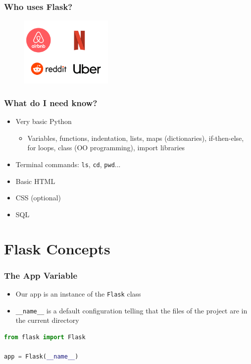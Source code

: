 \documentclass[fleqn,aspectratio=169,10pt]{beamer}
\begin{document}
\begin{frame}[fragile]
  \frametitle{Who uses Flask?}
          \pause
  \begin{figure}[]
    \centering
    \includegraphics[width=0.4\textwidth]{companies}
  \end{figure}
\end{frame}

\begin{frame}
  \frametitle{What do I need know?}
  \begin{itemize}
          \pause
    \item Very basic Python
          \begin{itemize}
            \item Variables, functions, indentation, lists, maps (dictionaries), if-then-else, for loops, class (OO programming), import libraries
          \end{itemize}
    \item Terminal commands: \texttt{ls}, \texttt{cd}, \texttt{pwd}...
    \item Basic HTML
    \item CSS (optional)
    \item SQL
  \end{itemize}
\end{frame}

\section{Flask Concepts}

\begin{frame}[fragile]
  \frametitle{The App Variable}
  \begin{itemize}
    \item Our app is an instance of the \texttt{Flask} class
    \item \texttt{\_\_name\_\_} is a default configuration telling that the files of the project are in the current directory
  \end{itemize}
\begin{lstlisting}[language=Python]
from flask import Flask

app = Flask(__name__)
\end{lstlisting}
\end{frame}
\end{document}
